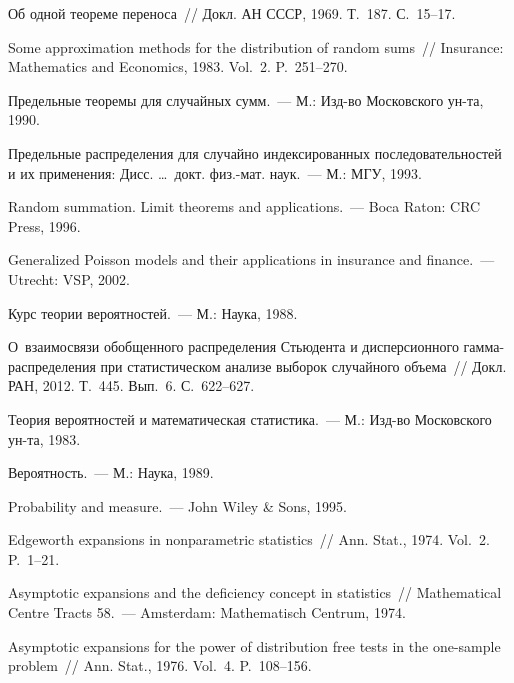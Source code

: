 \begin{multicols}{2}
{{\begin{thebibliography}{99}
 Об одной теореме переноса~// Докл. АН
СССР, 1969. Т.~187. С.~15--17.

 Some approximation methods for the
distri\-bution of random sums~// Insurance: Mathematics and
Economics, 1983. Vol.~2. P.~251--270.

 Предельные теоремы для случайных
сумм.~--- М.: Изд-во Московского ун-та, 1990.

 Предельные распределения для случайно
индексированных   последовательностей и их применения: Дисс. \ldots\
докт. физ.-мат. наук.~--- М.: МГУ, 1993.

 Random summation. Limit
theorems and applications.~--- Boca Raton: CRC Press, 1996.

 Generalized Poisson models and
their applications in insurance and finance.~--- Utrecht: VSP, 2002.

 Курс теории вероятностей.~--- М.: Наука, 1988.

 О~взаимосвязи обобщенного распределения
Стьюдента и дисперсионного гам\-ма-рас\-пре\-де\-ле\-ния при статистическом
анализе выборок случайного объема~// Докл. РАН, 2012. Т.~445.
Вып.~6. С.~622--627.

 Теория вероятностей и
математическая статистика.~--- М.: Изд-во Московского ун-та,
1983.

 Вероятность.~--- М.: Наука, 1989.

 Probability and measure.~--- John Wiley \&
Sons, 1995.

 Edgeworth expansions in nonparametric
statistics~// Ann. Stat., 1974. Vol.~2. P.~1--21.

 Asymptotic  expansions and the deficiency
concept in statistics~// Mathematical Centre Tracts 58.~---
Amsterdam: Mathematisch Centrum, 1974.

 Asymptotic
expansions for the power of distribution free tests in the
one-sample problem~// Ann. Stat., 1976. Vol.~4. P.~108--156.


\end{thebibliography}}}
\end{multicols}
